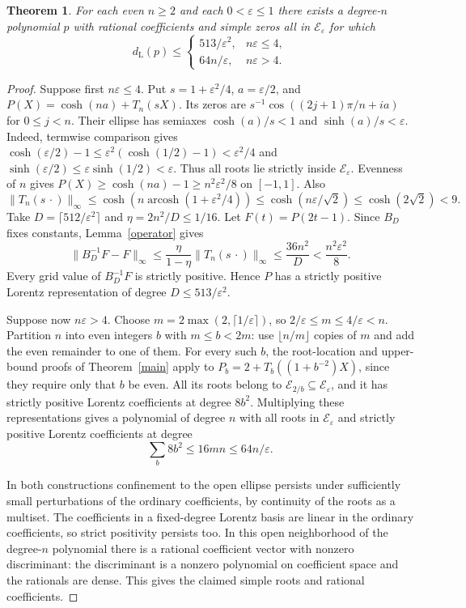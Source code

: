 \documentclass[11pt]{article}
\newtheorem{theorem}{Theorem}
\newcommand{\norm}[1]{\lVert #1\rVert_\infty}
\newcommand{\dd}{d_{\mathrm L}}
\begin{document}
\begin{theorem}\label{jointupper}
For each even $n\ge2$ and each $0<\varepsilon\le1$ there exists a degree-$n$ polynomial $p$ with rational coefficients and simple zeros all in $\mathcal E_\varepsilon$ for which
\[
 \dd(p)\le
 \begin{cases}
  513/\varepsilon^2,&n\varepsilon\le4,\\
  64n/\varepsilon,&n\varepsilon>4.
 \end{cases}
\]
\end{theorem}

\begin{proof}
Suppose first $n\varepsilon\le4$. Put $s=1+\varepsilon^2/4$, $a=\varepsilon/2$, and $P(X)=\cosh(na)+T_n(sX)$. Its zeros are
$s^{-1}\cos((2j+1)\pi/n+ia)$ for $0\le j<n$. Their ellipse has semiaxes $\cosh(a)/s<1$ and $\sinh(a)/s<\varepsilon$. Indeed, termwise comparison gives $\cosh(\varepsilon/2)-1\le\varepsilon^2(\cosh(1/2)-1)<\varepsilon^2/4$ and $\sinh(\varepsilon/2)\le\varepsilon\sinh(1/2)<\varepsilon$. Thus all roots lie strictly inside $\mathcal E_\varepsilon$. Evenness of $n$ gives $P(X)\ge\cosh(na)-1\ge n^2\varepsilon^2/8$ on $[-1,1]$. Also
\[
 \norm{T_n(s\,\cdot)}\le\cosh(n\operatorname{arcosh}(1+\varepsilon^2/4))
       \le\cosh(n\varepsilon/\sqrt2)\le\cosh(2\sqrt2)<9.
\]
Take $D=\lceil512/\varepsilon^2\rceil$ and $\eta=2n^2/D\le1/16$. Let $F(t)=P(2t-1)$. Since $B_D$ fixes constants, Lemma~\ref{operator} gives
\[
 \norm{B_D^{-1}F-F}\le\frac{\eta}{1-\eta}\norm{T_n(s\,\cdot)}
       \le \frac{36n^2}{D}<\frac{n^2\varepsilon^2}{8}.
\]
Every grid value of $B_D^{-1}F$ is strictly positive. Hence $P$ has a strictly positive Lorentz representation of degree $D\le513/\varepsilon^2$.

Suppose now $n\varepsilon>4$. Choose $m=2\max(2,\lceil1/\varepsilon\rceil)$, so $2/\varepsilon\le m\le4/\varepsilon<n$. Partition $n$ into even integers $b$ with $m\le b<2m$: use $\lfloor n/m\rfloor$ copies of $m$ and add the even remainder to one of them. For every such $b$, the root-location and upper-bound proofs of Theorem~\ref{main} apply to $P_b=2+T_b((1+b^{-2})X)$, since they require only that $b$ be even. All its roots belong to $\mathcal E_{2/b}\subseteq\mathcal E_\varepsilon$, and it has strictly positive Lorentz coefficients at degree $8b^2$. Multiplying these representations gives a polynomial of degree $n$ with all roots in $\mathcal E_\varepsilon$ and strictly positive Lorentz coefficients at degree
\[
                \sum_b8b^2\le16mn\le64 n/\varepsilon.
\]

In both constructions confinement to the open ellipse persists under sufficiently small perturbations of the ordinary coefficients, by continuity of the roots as a multiset. The coefficients in a fixed-degree Lorentz basis are linear in the ordinary coefficients, so strict positivity persists too. In this open neighborhood of the degree-$n$ polynomial there is a rational coefficient vector with nonzero discriminant: the discriminant is a nonzero polynomial on coefficient space and the rationals are dense. This gives the claimed simple roots and rational coefficients.
\end{proof}
\end{document}
